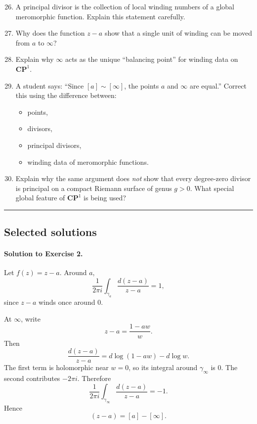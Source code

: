 \documentclass[11pt]{article}
\begin{document}
	\begin{enumerate}
		\setcounter{enumi}{25}
		
		\item A principal divisor is the collection of local winding numbers of a global meromorphic function. Explain this statement carefully.
		
		\item Why does the function \(z-a\) show that a single unit of winding can be moved from \(a\) to \(\infty\)?
		
		\item Explain why \(\infty\) acts as the unique ``balancing point'' for winding data on \(\mathbf{CP}^1\).
		
		\item A student says: ``Since \([a]\sim[\infty]\), the points \(a\) and \(\infty\) are equal.''  
		Correct this using the difference between:
		\begin{itemize}
			\item points,
			\item divisors,
			\item principal divisors,
			\item winding data of meromorphic functions.
		\end{itemize}
		
		\item Explain why the same argument does \emph{not} show that every degree-zero divisor is principal on a compact Riemann surface of genus \(g>0\).  
		What special global feature of \(\mathbf{CP}^1\) is being used?
	\end{enumerate}
	
	\bigskip
	\hrule
	\bigskip
	
	\subsection*{Selected solutions}
	
	\paragraph{Solution to Exercise 2.}
	Let \(f(z)=z-a\). Around \(a\),
	\[
	\frac{1}{2\pi i}\int_{\gamma_a}\frac{d(z-a)}{z-a}=1,
	\]
	since \(z-a\) winds once around \(0\).
	
	At \(\infty\), write
	\[
	z-a=\frac{1-aw}{w}.
	\]
	Then
	\[
	\frac{d(z-a)}{z-a}=d\log(1-aw)-d\log w.
	\]
	The first term is holomorphic near \(w=0\), so its integral around \(\gamma_\infty\) is \(0\). The second contributes \(-2\pi i\). Therefore
	\[
	\frac{1}{2\pi i}\int_{\gamma_\infty}\frac{d(z-a)}{z-a}=-1.
	\]
	Hence
	\[
	(z-a)=[a]-[\infty].
	\]
	
\end{document}
